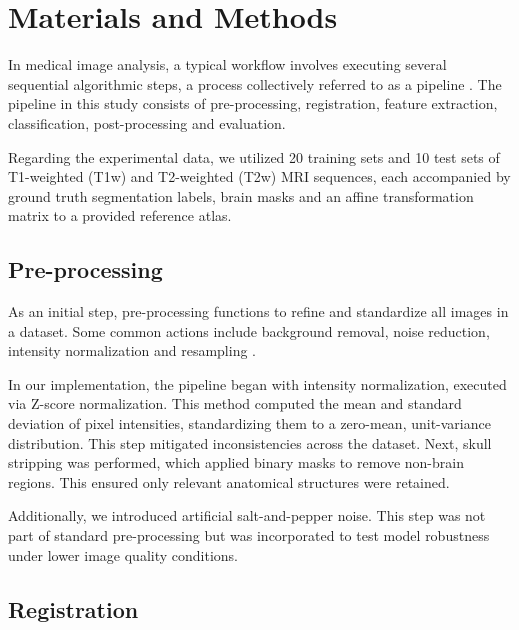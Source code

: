 \section{Materials and Methods}

In medical image analysis, a typical workflow involves executing several sequential algorithmic steps, a process collectively referred to as a pipeline \cite{b8}. The pipeline in this study consists of pre-processing, registration, feature extraction, classification, post-processing and evaluation. 

Regarding the experimental data, we utilized 20 training sets and 10 test sets of T1-weighted (T1w) and T2-weighted (T2w) MRI sequences, each accompanied by ground truth segmentation labels, brain masks and an affine transformation matrix to a provided reference atlas.

\subsection{Pre-processing}

As an initial step, pre-processing functions to refine and standardize all images in a dataset. Some common actions include background removal, noise reduction, intensity normalization and resampling \cite{b9}.

In our implementation, the pipeline began with intensity normalization, executed via Z-score normalization. This method computed the mean and standard deviation of pixel intensities, standardizing them to a zero-mean, unit-variance distribution. This step mitigated inconsistencies across the dataset. Next, skull stripping was performed, which applied binary masks to remove non-brain regions. This ensured only relevant anatomical structures were retained.

Additionally, we introduced artificial salt-and-pepper noise. This step was not part of standard pre-processing but was incorporated to test model robustness under lower image quality conditions.


\subsection{Registration}

